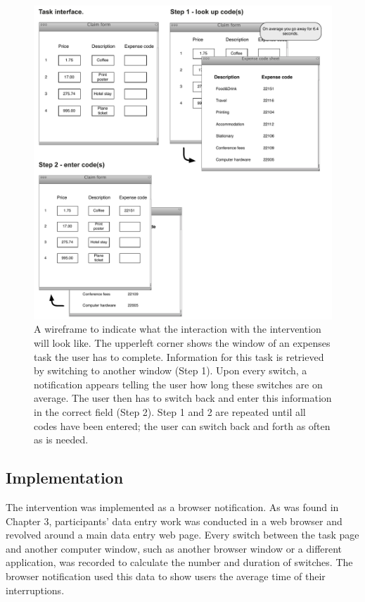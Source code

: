 \begin{figure}
\centering
\includegraphics[width=\textwidth]{images/ch56/ch56-wireframe.pdf}
\caption[Wireframe of the design intervention.]{A wireframe to indicate what the interaction with the intervention will look like. The upperleft corner shows the window of an expenses task the user has to complete. Information for this task is retrieved by switching to another window (Step 1). Upon every switch, a notification appears telling the user how long these switches are on average. The user then has to switch back and enter this information in the correct field (Step 2). Step 1 and 2 are repeated until all codes have been entered; the user can switch back and forth as often as is needed.}
\label{fig:ch56-6_Wireframe}
\end{figure}

\subsection{Implementation}
The intervention was implemented as a browser notification. As was found in Chapter 3, participants’ data entry work was conducted in a web browser and revolved around a main data entry web page. Every switch between the task page and another computer window, such as another browser window or a different application, was recorded to calculate the number and duration of switches. The browser notification used this data to show users the average time of their interruptions. 

